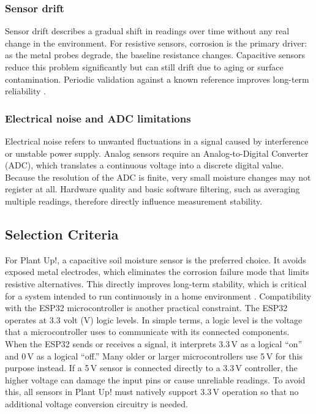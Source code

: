 \subsubsection*{Sensor drift}

Sensor drift describes a gradual shift in readings over time without any real change in the environment. For resistive sensors, corrosion is the primary driver: as the metal probes degrade, the baseline resistance changes. Capacitive sensors reduce this problem significantly but can still drift due to aging or surface contamination. Periodic validation against a known reference improves long-term reliability \cite{chowdhuryCalibration2022, seeedCapacitive}.
\subsubsection*{Electrical noise and ADC limitations}

Electrical noise refers to unwanted fluctuations in a signal caused by interference or unstable power supply. Analog sensors require an Analog-to-Digital Converter (ADC), which translates a continuous voltage into a discrete digital value. Because the resolution of the ADC is finite, very small moisture changes may not register at all. Hardware quality and basic software filtering, such as averaging multiple readings, therefore directly influence measurement stability.

\subsection{Selection Criteria}

For Plant Up!, a capacitive soil moisture sensor is the preferred choice. It avoids exposed metal electrodes, which eliminates the corrosion failure mode that limits resistive alternatives. This directly improves long-term stability, which is critical for a system intended to run continuously in a home environment \cite{seeedCapacitive}.
Compatibility with the ESP32 microcontroller is another practical constraint. The ESP32 operates at 3.3 volt (V) logic levels. In simple terms, a logic level is the voltage that a microcontroller uses to communicate with its connected components. When the ESP32 sends or receives a signal, it interprets 3.3\,V as a logical ``on'' and 0\,V as a logical ``off.'' Many older or larger microcontrollers use 5\,V for this purpose instead. If a 5\,V sensor is connected directly to a 3.3\,V controller, the higher voltage can damage the input pins or cause unreliable readings. To avoid this, all sensors in Plant Up! must natively support 3.3\,V operation so that no additional voltage conversion circuitry is needed.

